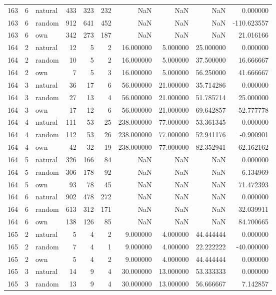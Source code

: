 \begin{table}[htbp]
\begin{tabular}{rrlrrrrrrr}
163 & 6 & natural & 433 & 323 & 232 & NaN & NaN & NaN & 0.000000 \\
163 & 6 & random & 912 & 641 & 452 & NaN & NaN & NaN & -110.623557 \\
163 & 6 & own & 342 & 273 & 187 & NaN & NaN & NaN & 21.016166 \\
164 & 2 & natural & 12 & 5 & 2 & 16.000000 & 5.000000 & 25.000000 & 0.000000 \\
164 & 2 & random & 10 & 5 & 2 & 16.000000 & 5.000000 & 37.500000 & 16.666667 \\
164 & 2 & own & 7 & 5 & 3 & 16.000000 & 5.000000 & 56.250000 & 41.666667 \\
164 & 3 & natural & 36 & 17 & 6 & 56.000000 & 21.000000 & 35.714286 & 0.000000 \\
164 & 3 & random & 27 & 13 & 4 & 56.000000 & 21.000000 & 51.785714 & 25.000000 \\
164 & 3 & own & 17 & 12 & 6 & 56.000000 & 21.000000 & 69.642857 & 52.777778 \\
164 & 4 & natural & 111 & 53 & 25 & 238.000000 & 77.000000 & 53.361345 & 0.000000 \\
164 & 4 & random & 112 & 53 & 26 & 238.000000 & 77.000000 & 52.941176 & -0.900901 \\
164 & 4 & own & 42 & 32 & 19 & 238.000000 & 77.000000 & 82.352941 & 62.162162 \\
164 & 5 & natural & 326 & 166 & 84 & NaN & NaN & NaN & 0.000000 \\
164 & 5 & random & 306 & 178 & 92 & NaN & NaN & NaN & 6.134969 \\
164 & 5 & own & 93 & 78 & 45 & NaN & NaN & NaN & 71.472393 \\
164 & 6 & natural & 902 & 478 & 272 & NaN & NaN & NaN & 0.000000 \\
164 & 6 & random & 613 & 312 & 171 & NaN & NaN & NaN & 32.039911 \\
164 & 6 & own & 138 & 126 & 85 & NaN & NaN & NaN & 84.700665 \\
165 & 2 & natural & 5 & 4 & 2 & 9.000000 & 4.000000 & 44.444444 & 0.000000 \\
165 & 2 & random & 7 & 4 & 1 & 9.000000 & 4.000000 & 22.222222 & -40.000000 \\
165 & 2 & own & 5 & 4 & 2 & 9.000000 & 4.000000 & 44.444444 & 0.000000 \\
165 & 3 & natural & 14 & 9 & 4 & 30.000000 & 13.000000 & 53.333333 & 0.000000 \\
165 & 3 & random & 13 & 9 & 4 & 30.000000 & 13.000000 & 56.666667 & 7.142857 \\

\end{tabular}
\end{table}
